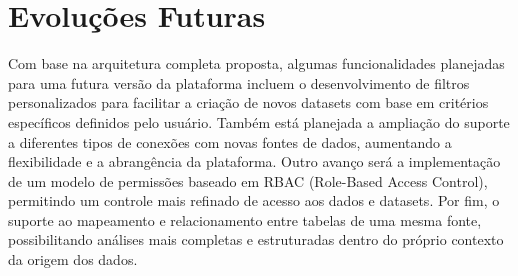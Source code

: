 \section{Evoluções Futuras}
Com base na arquitetura completa proposta, algumas funcionalidades planejadas para uma futura versão da plataforma incluem o desenvolvimento de filtros personalizados para facilitar a criação de novos datasets com base em critérios específicos definidos pelo usuário. Também está planejada a ampliação do suporte a diferentes tipos de conexões com novas fontes de dados, aumentando a flexibilidade e a abrangência da plataforma. Outro avanço será a implementação de um modelo de permissões baseado em RBAC (Role-Based Access Control), permitindo um controle mais refinado de acesso aos dados e datasets. Por fim, o suporte ao mapeamento e relacionamento entre tabelas de uma mesma fonte, possibilitando análises mais completas e estruturadas dentro do próprio contexto da origem dos dados.
